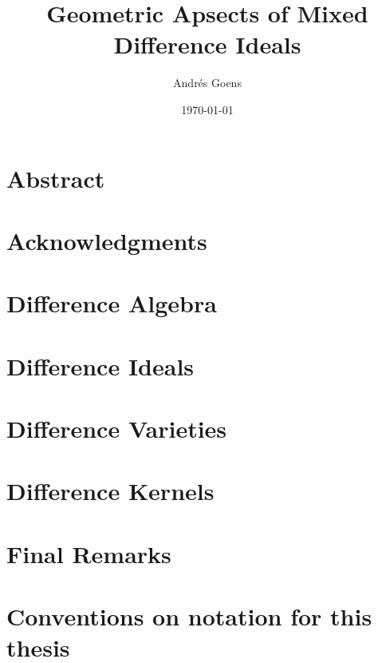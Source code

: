 \documentclass[12pt,a4paper,BCOR15mm,twoside,DIV12]{article}
\title{Geometric Apsects of Mixed Difference Ideals}
\author{Andr\'{e}s Goens}
\date{\today}
\theoremstyle{plain}
\theoremstyle{definition}
\begin{document}
\setlength{\parindent}{1.5em}

\maketitle

\clearpage
\section*{Abstract}

\clearpage
\section*{Acknowledgments}
\clearpage

\tableofcontents

\clearpage 


\section{Difference Algebra}

\clearpage 
\section{Difference Ideals}



\clearpage 
\section{Difference Varieties}


\clearpage 
\section{Difference Kernels}
\clearpage

\section{Final Remarks}


\clearpage 


\clearpage
\section*{Conventions on notation for this thesis} 


\clearpage
\printindex
\end{document}
